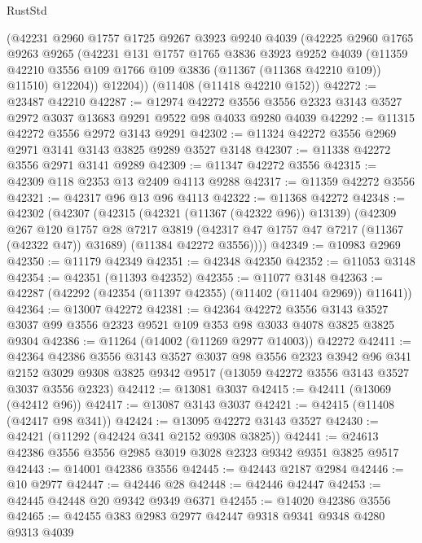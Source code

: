 \begin{lexlean}{RustStd}
\begin{coremodule}
      (@42231
        @2960
        @1757
        @1725
        @9267
        @3923
        @9240
        @4039
        (@42225
          @2960
          @1765
          @9263
          @9265
          (@42231
            @131
            @1757
            @1765
            @3836
            @3923
            @9252
            @4039
            (@11359 @42210 @3556 @109 @1766 @109 @3836 (@11367 (@11368 @42210 @109)) @11510)
            @12204))
        @12204))
    (@11408 (@11418 @42210 @152))
@42272 := @23487 @42210
@42287 := @12974
    @42272
    @3556
    @3556
    @2323
    @3143
    @3527
    @2972
    @3037
    @13683
    @9291
    @9522
    @98
    @4033
    @9280
    @4039
@42292 := @11315 @42272 @3556 @2972 @3143 @9291
@42302 := @11324 @42272 @3556 @2969 @2971 @3141 @3143 @3825 @9289 @3527 @3148
@42307 := @11338 @42272 @3556 @2971 @3141 @9289
@42309 := @11347 @42272 @3556
@42315 := @42309 @118 @2353 @13 @2409 @4113 @9288
@42317 := @11359 @42272 @3556
@42321 := @42317 @96 @13 @96 @4113
@42322 := @11368 @42272
@42348 := @42302
    (@42307
      (@42315
        (@42321 (@11367 (@42322 @96)) @13139)
        (@42309
          @267
          @120
          @1757
          @28
          @7217
          @3819
          (@42317 @47 @1757 @47 @7217 (@11367 (@42322 @47)) @31689)
          (@11384 @42272 @3556))))
@42349 := @10983 @2969
@42350 := @11179 @42349
@42351 := @42348 @42350
@42352 := @11053 @3148
@42354 := @42351 (@11393 @42352)
@42355 := @11077 @3148
@42363 := @42287 (@42292 (@42354 (@11397 @42355) (@11402 (@11404 @2969)) @11641))
@42364 := @13007 @42272
@42381 := @42364
    @42272
    @3556
    @3143
    @3527
    @3037
    @99
    @3556
    @2323
    @9521
    @109
    @353
    @98
    @3033
    @4078
    @3825
    @3825
    @9304
@42386 := @11264 (@14002 (@11269 @2977 @14003)) @42272
@42411 := @42364
    @42386
    @3556
    @3143
    @3527
    @3037
    @98
    @3556
    @2323
    @3942
    @96
    @341
    @2152
    @3029
    @9308
    @3825
    @9342
    @9517
    (@13059 @42272 @3556 @3143 @3527 @3037 @3556 @2323)
@42412 := @13081 @3037
@42415 := @42411 (@13069 (@42412 @96))
@42417 := @13087 @3143 @3037
@42421 := @42415 (@11408 (@42417 @98 @341))
@42424 := @13095 @42272 @3143 @3527
@42430 := @42421 (@11292 (@42424 @341 @2152 @9308 @3825))
@42441 := @24613 @42386 @3556 @3556 @2985 @3019 @3028 @2323 @9342 @9351 @3825 @9517
@42443 := @14001 @42386 @3556
@42445 := @42443 @2187 @2984
@42446 := @10 @2977
@42447 := @42446 @28
@42448 := @42446 @42447
@42453 := @42445 @42448 @20 @9342 @9349 @6371
@42455 := @14020 @42386 @3556
@42465 := @42455 @383 @2983 @2977 @42447 @9318 @9341 @9348 @4280 @9313 @4039

\end{coremodule}
\end{lexlean}
